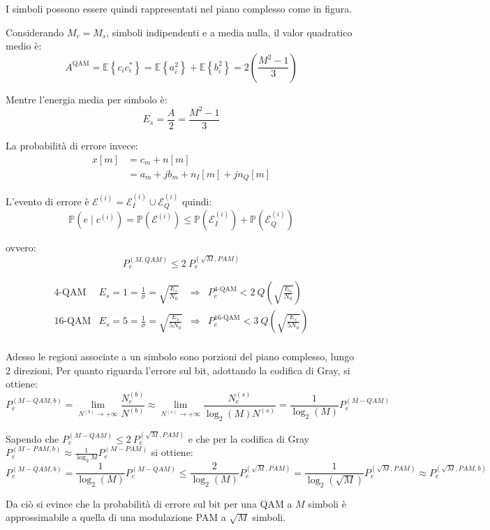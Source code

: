 I simboli possono essere quindi rappresentati nel piano complesso come in figura.

Considerando $M_c = M_s$, simboli indipendenti e a media nulla, il valor quadratico medio è:
\[
    A^{\text{QAM}} = \mathbb{E} \left\{  c_i c^*_i  \right\} = \mathbb{E} \left\{ a_i^2 \right\} + \mathbb{E} \left\{ b_i^2 \right\} = 2 \left( \frac{M^2 - 1}{3} \right)
\]

Mentre l'energia media per simbolo è:
\[
    E_s = \frac{A}{2} = \frac{M^2 - 1}{3}
\]

La probabilità di errore invece:
\begin{align*}
    x\left[ m \right] &= c_m + n \left[ m \right] \\
    &= a_m + j b_m + n_I \left[ m \right] + j n_Q \left[ m \right]
\end{align*}


L'evento di errore è $\mathcal{E}^{(i)} = \mathcal{E}_I^{(i)} \cup \mathcal{E}_Q^{(i)}$ quindi:
\[
    \mathbb{P} \left( e \mid c^{(i)} \right) = \mathbb{P} \left( \mathcal{E}^{(i)} \right) \leq \mathbb{P} \left( \mathcal{E}_I^{(i)} \right) + \mathbb{P} \left( \mathcal{E}_Q^{(i)} \right)
\]

ovvero:
\[
    P_e^{(M, QAM)} \leq 2 \ P_e^{(\sqrt{M}, PAM)}
\]





\[
\begin{array}{ccccc}
\text{4-QAM} & E_s = 1 = \frac{1}{\sigma} = \sqrt{\frac{E_s}{N_0}} & \Rightarrow & P_e^{\text{4-QAM}} < 2 \ Q\left(\sqrt{\frac{E_s}{N_0}}\right) \\
\text{16-QAM} & E_s = 5 = \frac{1}{\sigma} = \sqrt{\frac{E_s}{5N_0}} & \Rightarrow & P_e^{\text{16-QAM}} < 3 \ Q\left(\sqrt{\frac{E_s}{5N_0}}\right)\\
\end{array}
\]

Adesso le regioni associate a un simbolo sono porzioni del piano complesso, lungo 2 direzioni,
Per quanto riguarda l'errore sul bit, adottando la codifica di Gray, si ottiene:
\[
    P_e^{(M-QAM, b)} = \lim_{N^{(b)} \to +\infty} \frac{N_e^{(b)}}{N^{(b)}} \approx \lim_{N^{(s)} \to +\infty} \frac{N_e^{(s)}}{\log_2(M) N^{(s)}} = \frac{1}{\log_2(M)} P_e^{(M-QAM)} 
\]

Sapendo che $P_e^{(M-QAM)} \leq 2 \ P_e^{(\sqrt{M}, PAM)}$ e che per la codifica di Gray $P_e^{(M-PAM, b)} \approx \frac{1}{\log_2{M}} P_e^{(M-PAM)}$ si ottiene:
\[
     P_e^{(M-QAM, b)} = \frac{1}{\log_2(M)} P_e^{(M-QAM)} \leq \frac{2}{\log_2(M)} P_e^{(\sqrt{M}, PAM)} = \frac{1}{\log_2(\sqrt{M})} P_e^{(\sqrt{M}, PAM)} \approx P_e^{(\sqrt{M}, PAM, b)}
\]

Da ciò si evince che la probabilità di errore sul bit per una QAM a $M$ simboli è approssimabile a quella di una modulazione PAM a $\sqrt{M}$ simboli.

